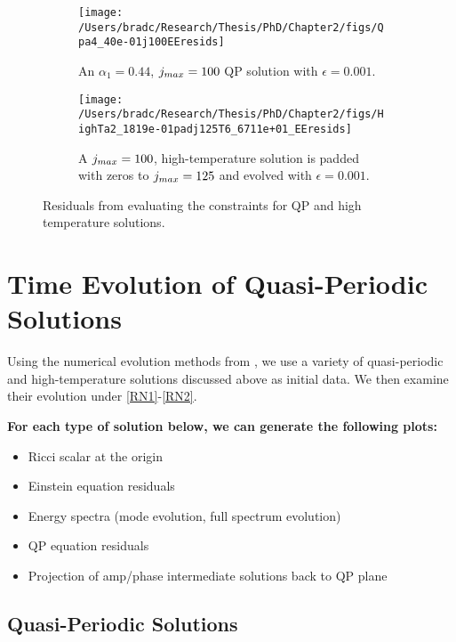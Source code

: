 \documentclass[../PhD.tex]{subfiles}
\begin{document}
\begin{figure}[h]
	\centering
	\begin{subfigure}[t]{0.45\textwidth}
		\texttt{[image: /Users/bradc/Research/Thesis/PhD/Chapter2/figs/Qpa4\_40e-01j100EEresids]}
		\caption{An $\alpha_1 = 0.44$, $j_{max} = 100$ QP solution with $\epsilon = 0.001$.}
		\label{fig:QPEEresid}
	\end{subfigure}
	\;
	\begin{subfigure}[t]{0.45\textwidth}
		\texttt{[image: /Users/bradc/Research/Thesis/PhD/Chapter2/figs/HighTa2\_1819e-01padj125T6\_6711e+01\_EEresids]}
		\caption{A $j_{max} = 100$, high-temperature solution is padded with zeros to $j_{max} = 125$ and evolved with $\epsilon = 0.001$.}
		\label{fig:highTEEresid}
	\end{subfigure}
	\caption{Residuals from evaluating the constraints for QP and high temperature solutions.}
	\label{fig:EEresids}
\end{figure}


\section{Time Evolution of Quasi-Periodic Solutions}
\label{sec: time evolution}

Using the numerical evolution methods from \cite{1606.02712}, we use a variety of quasi-periodic and high-temperature solutions discussed above as initial data. We then examine their evolution under \eqref{RN1}-\eqref{RN2}.

{\bf For each type of solution below, we can generate the following plots:
\begin{itemize}
\item Ricci scalar at the origin
\item Einstein equation residuals
\item Energy spectra (mode evolution, full spectrum evolution)
\item QP equation residuals 
\item Projection of amp/phase intermediate solutions back to QP plane
\end{itemize}
}


\subsection{Quasi-Periodic Solutions}
\end{document}
